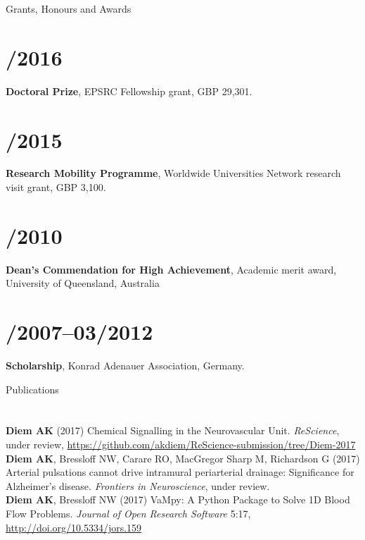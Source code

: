 \documentclass[margin,line,10pt]{res}
\begin{document}
\begin{resume}
\vspace*{-.2in}

{\sc Grants, Honours and Awards}\\
\vspace*{-.35in}
\section{/2016}{\bf Doctoral Prize}, EPSRC Fellowship grant, GBP 29,301.\\
\vspace*{-.35in}
\section{/2015}{\bf Research Mobility Programme}, Worldwide Universities Network research visit grant, GBP 3,100.\\        
\vspace*{-.35in}
\section{/2010}{\bf Dean's Commendation for High Achievement}, Academic merit award, University of Queensland, Australia\\
\vspace*{-.35in}
\section{/2007--03/2012}{\bf Scholarship}, Konrad Adenauer Association, Germany.\\        

\vspace*{-.2in}

{\sc Publications}\\
\vspace*{-.35in}
\section{}
{\bf Diem AK} (2017) Chemical Signalling in the Neurovascular Unit. \textit{ReScience}, under review, \url{https://github.com/akdiem/ReScience-submission/tree/Diem-2017}\\
{\bf Diem AK}, Bressloff NW, Carare RO, MacGregor Sharp M, Richardson G (2017) Arterial pulsations cannot drive intramural periarterial drainage: Significance for Alzheimer's disease. \textit{Frontiers in Neuroscience}, under review.\\
{\bf Diem AK}, Bressloff NW (2017) VaMpy: A Python Package to Solve 1D Blood Flow Problems. {\em Journal of Open Research Software} 5:17, \url{http://doi.org/10.5334/jors.159}\\
\vspace*{-.35in}

\end{resume}
\end{document}
